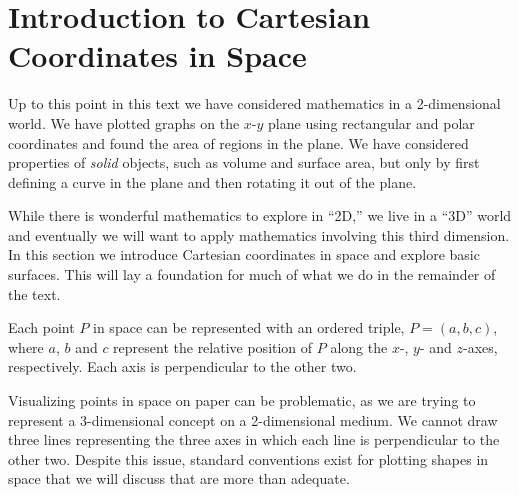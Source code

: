 \section{Introduction to Cartesian Coordinates in Space}\label{sec:space_coord}

Up to this point in this text we have considered mathematics in a 2-dimensional world. We have plotted graphs on the $x$-$y$ plane using rectangular and polar coordinates and found the area of regions in the plane. We have considered properties of \emph{solid} objects, such as volume and surface area, but only by first defining a curve in the plane and then rotating it out of the plane.

While there is wonderful mathematics to explore in ``2D,'' we live in a ``3D'' world and eventually we will want to apply mathematics involving this third dimension. In this section we introduce Cartesian coordinates in space and explore basic surfaces. This will lay a foundation for much of what we do in the remainder of the text.\bigskip

Each point $P$ in space can be represented with an ordered triple, $P=(a,b,c)$, where $a$, $b$ and $c$ represent the relative position of $P$ along the $x$-, $y$- and $z$-axes, respectively. Each axis is perpendicular to the other two.

Visualizing points in space on paper can be problematic, as we are trying to represent a 3-dimensional concept on a 2-dimensional medium. We cannot draw three lines representing the three axes in which each line is perpendicular to the other two. Despite this issue, standard conventions exist for plotting shapes in space that we will discuss that are more than adequate.


